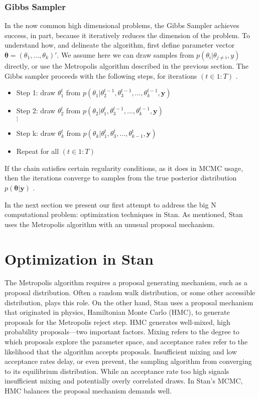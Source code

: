 \subsubsection{Gibbs Sampler}
In the now common high dimensional problems, the Gibbs Sampler achieves success, in part, because it iteratively reduces the dimension of the problem. To understand how, and delineate the algorithm, first define parameter vector $\pmb{\theta} = (\theta_{1}, \dots, \theta_{k})'$. We assume here we can draw samples from $p(\theta_{i}|\theta_{j \neq i},y)$ directly, or use the Metropolis algorithm described in the previous section. The Gibbs sampler proceeds with the following steps, for iterations $(t \in 1:T)$ \citep{Banerjee2014}. 
        \begin{itemize} 
        \item Step 1: draw $\theta_{1}^{t}$ from $p \left( \theta_{1}|\theta_{2}^{t-1}, \theta_{3}^{t-1},\dots,\theta_{k}^{t-1},\pmb{y} \right)$ 
        \item Step 2: draw $\theta_{2}^{t}$ from $p \left(\theta_{2}|\theta_{1}^{t}, \theta_{3}^{t-1},\dots,\theta_{k}^{t-1},\pmb{y} \right)$ \\
        $\vdots$
        \item Step k: draw $\theta_{k}^{t}$ from $p \left( \theta_{k}|\theta_{1}^{t}, \theta_{3}^{t},\dots,\theta_{k-1}^{t},\pmb{y} \right)$ 
        \item Repeat for all $(t \in 1:T)$
        \end{itemize} 
If the chain satisfies certain regularity conditions, as it does in MCMC usage, then the iterations converge to samples from the true posterior distribution $p(\pmb{\theta}|\pmb{y})$ \citep{Banerjee2014}. 

In the next section we present our first attempt to address the big N computational problem: optimization techniques in Stan. As mentioned, Stan uses the Metropolis algorithm with an unusual proposal mechanism.

\section{Optimization in Stan} \label{stanopt} %

The Metropolis algorithm requires a proposal generating mechanism, such as a proposal distribution. Often a random walk distribution, or some other accessible distribution, plays this role. On the other hand, Stan uses a proposal mechanism that originated in physics, Hamiltonian Monte Carlo (HMC), to generate proposals for the Metropolis reject step. HMC generates well-mixed, high probability proposals---two important factors. Mixing refers to the degree to which proposals explore the parameter space, and acceptance rates refer to the likelihood that the algorithm accepts proposals. Insufficient mixing and low acceptance rates delay, or even prevent, the sampling algorithm from converging to its equilibrium distribution. While an acceptance rate too high signals insufficient mixing and potentially overly correlated draws. In Stan's MCMC, HMC balances the proposal mechanism demands well. 

